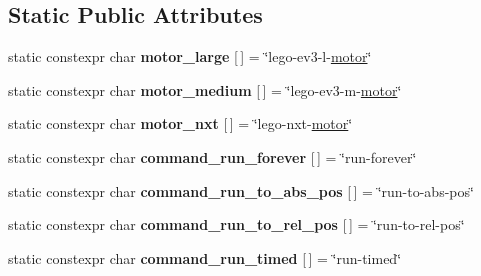 \subsection*{Static Public Attributes}
\begin{DoxyCompactItemize}
\item 
\mbox{\label{classev3dev_1_1motor_a1e1c71501f546e2d0a453783cf573155}} 
static constexpr char {\bfseries motor\+\_\+large} \mbox{[}$\,$\mbox{]} = \char`\"{}lego-\/ev3-\/l-\/\hyperlink{classev3dev_1_1motor}{motor}\char`\"{}
\item 
\mbox{\label{classev3dev_1_1motor_af6f751b689fa368df42fd0e18c8cdb49}} 
static constexpr char {\bfseries motor\+\_\+medium} \mbox{[}$\,$\mbox{]} = \char`\"{}lego-\/ev3-\/m-\/\hyperlink{classev3dev_1_1motor}{motor}\char`\"{}
\item 
\mbox{\label{classev3dev_1_1motor_a0935ca9997e43f0242684a08aa13fd2f}} 
static constexpr char {\bfseries motor\+\_\+nxt} \mbox{[}$\,$\mbox{]} = \char`\"{}lego-\/nxt-\/\hyperlink{classev3dev_1_1motor}{motor}\char`\"{}
\item 
\mbox{\label{classev3dev_1_1motor_a3782306a29667e1611498c3faa3d5155}} 
static constexpr char {\bfseries command\+\_\+run\+\_\+forever} \mbox{[}$\,$\mbox{]} = \char`\"{}run-\/forever\char`\"{}
\item 
\mbox{\label{classev3dev_1_1motor_a169665309c2ed9df7bf2f46cb995ae17}} 
static constexpr char {\bfseries command\+\_\+run\+\_\+to\+\_\+abs\+\_\+pos} \mbox{[}$\,$\mbox{]} = \char`\"{}run-\/to-\/abs-\/pos\char`\"{}
\item 
\mbox{\label{classev3dev_1_1motor_a7ddcb64c76499fbd90d9ce4b7feeac8b}} 
static constexpr char {\bfseries command\+\_\+run\+\_\+to\+\_\+rel\+\_\+pos} \mbox{[}$\,$\mbox{]} = \char`\"{}run-\/to-\/rel-\/pos\char`\"{}
\item 
\mbox{\label{classev3dev_1_1motor_a64f917e0b265db7b5b2f55942b76dd4f}} 
static constexpr char {\bfseries command\+\_\+run\+\_\+timed} \mbox{[}$\,$\mbox{]} = \char`\"{}run-\/timed\char`\"{}
\item 
\mbox{\label{classev3dev_1_1motor_ae18c070630c47c5f325dcc8172c0b4e5}} 

\end{DoxyCompactItemize}
